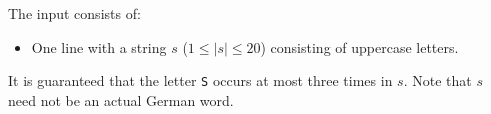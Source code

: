 
  The input consists of:
  \begin{itemize}
    \item One line with a string $s$ ($1 \le |s| \le 20$) consisting of uppercase letters.
  \end{itemize}
  It is guaranteed that the letter \texttt{S} occurs at most three times in $s$.
  Note that $s$ need not be an actual German word.
